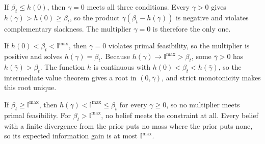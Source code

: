 \documentclass{l4dc2027}
\newenvironment{proofof}[1]{\par\noindent{\bfseries\upshape Proof of #1\ }}{\jmlrQED}
\begin{document}
\begin{proofof}{Lemma~\ref{lem:multiplier}}
If $\beta_t \leq h(0)$, then $\gamma = 0$ meets all three conditions. Every $\gamma > 0$ gives $h(\gamma) > h(0) \geq \beta_t$, so the product $\gamma (\beta_t - h(\gamma))$ is negative and violates complementary slackness. The multiplier $\gamma = 0$ is therefore the only one.

If $h(0) < \beta_t < \mathbb{I}^{\max}$, then $\gamma = 0$ violates primal feasibility, so the multiplier is positive and solves $h(\gamma) = \beta_t$. Because $h(\gamma) \to \mathbb{I}^{\max} > \beta_t$, some $\bar{\gamma} > 0$ has $h(\bar{\gamma}) > \beta_t$. The function $h$ is continuous with $h(0) < \beta_t < h(\bar{\gamma})$, so the intermediate value theorem gives a root in $(0, \bar{\gamma})$, and strict monotonicity makes this root unique.

If $\beta_t \geq \mathbb{I}^{\max}$, then $h(\gamma) < \mathbb{I}^{\max} \leq \beta_t$ for every $\gamma \geq 0$, so no multiplier meets primal feasibility. For $\beta_t > \mathbb{I}^{\max}$, no belief meets the constraint at all. Every belief with a finite divergence from the prior puts no mass where the prior puts none, so its expected information gain is at most $\mathbb{I}^{\max}$.
\end{proofof}
\end{document}
